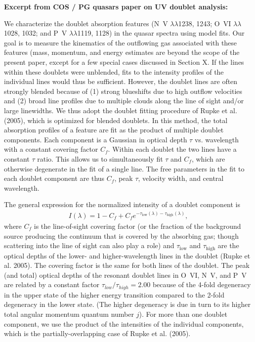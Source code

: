 \documentclass[modern,pdftex]{aastex631}
\begin{document}
{\bf Excerpt from COS / PG quasars paper on UV doublet analysis:}

We characterize the doublet absorption features (N~V
$\lambda\lambda$1238, 1243; O~VI $\lambda\lambda$1028, 1032; and P~V
$\lambda\lambda$1119, 1128) in the quasar spectra using model
fits. Our goal is to measure the kinematics of the outflowing gas
associated with these features (mass, momentum, and energy estimates
are beyond the scope of the present paper, except for a few special
cases discussed in Section X. If the lines within these doublets were
unblended, fits to the intensity profiles of the individual lines
would thus be sufficient. However, the doublet lines are often
strongly blended because of (1) strong blueshifts due to high outflow
velocities and (2) broad line profiles due to multiple clouds along
the line of sight and/or large linewidths. We thus adopt the doublet
fitting procedure of Rupke et al. (2005), which is optimized for
blended doublets. In this method, the total absorption profiles of a
feature are fit as the product of multiple doublet components. Each
component is a Gaussian in optical depth $\tau$ vs. wavelength with a
constant covering factor $C_f$. Within each doublet the two lines have
a constant $\tau$ ratio. This allows us to simultaneously fit $\tau$
and $C_f$, which are otherwise degenerate in the fit of a single
line. The free parameters in the fit to each doublet component are
thus $C_f$, peak $\tau$, velocity width, and central wavelength.

The general expression for the normalized intensity of a doublet
component is
\begin{eqnarray}
  I(\lambda) = 1 - C_f + C_f e^{-\tau_\mathrm{low}(\lambda)-\tau_\mathrm{high}(\lambda)},
\label{eq:I_lambda}
\end{eqnarray}
where $C_f$ is the line-of-sight covering factor (or the fraction of
the background source producing the continuum that is covered by the
absorbing gas; though scattering into the line of sight can also play
a role) and $\tau_\mathrm{low}$ and $\tau_\mathrm{high}$ are the
optical depths of the lower- and higher-wavelength lines in the
doublet (Rupke et al. 2005). The covering factor is the same for both
lines of the doublet. The peak (and total) optical depths of the
resonant doublet lines in O~VI, N~V, and P~V are related by a constant
factor $\tau_{low}/\tau_{high} = 2.00$ because of the 4-fold
degeneracy in the upper state of the higher energy transition compared
to the 2-fold degeneracy in the lower state. (The higher degeneracy is
due in turn to its higher total angular momentum quantum number
$j$). For more than one doublet component, we use the product of the
intensities of the individual components, which is the
partially-overlapping case of Rupke et al. (2005).
\end{document}
